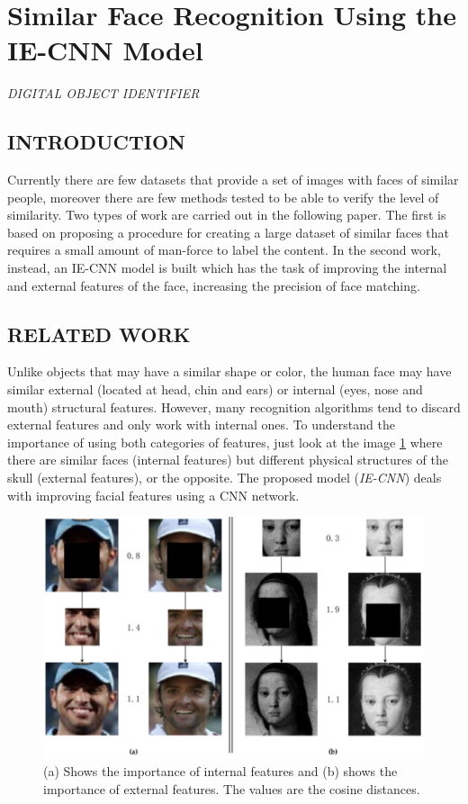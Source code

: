 \section{Similar Face Recognition Using the IE-CNN Model}

\begin{center}
    \author{
    An-Ping Song,
    Qian Hu,
    Xue-Hai Ding,
    Xin-Yi Di,
    Zi-Heng Song
    }
\end{center}

\begin{center}
    \emph{DIGITAL OBJECT IDENTIFIER}
\end{center}

\subsection{INTRODUCTION}
Currently there are few datasets that provide a set of images with faces of 
similar people, moreover there are few methods tested to be able to verify 
the level of similarity. Two types of work are carried out in the following paper. 
The first is based on proposing a procedure for creating a large dataset of 
similar faces that requires a small amount of man-force to label the content. 
In the second work, instead, an IE-CNN model is built which has the task 
of improving the internal and external features of the face, increasing the 
precision of face matching.

\subsection{RELATED WORK}
Unlike objects that may have a similar shape or color, the human face may 
have similar external (located at head, chin and ears) or internal (eyes, nose 
and mouth) structural features. However, many recognition algorithms tend 
to discard external features and only work with internal ones. To understand 
the importance of using both categories of features, just look at the image \ref{fig:features} 
where there are similar faces (internal features) but different physical structures 
of the skull (external features), or the opposite. The proposed model 
(\emph{IE-CNN}) deals with improving facial features using a CNN network.
\begin{figure}[h!]
    \centering
    \includegraphics[width = 0.8\linewidth]{images/paper9/importance.png}
    \centering
    \caption{(a) Shows the importance of internal features and (b) shows the importance of external features. The values are the cosine distances.}
    \label{fig:features}
\end{figure}

